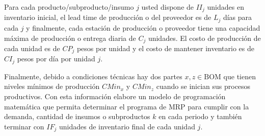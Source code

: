 \documentclass[11pt, a4paper]{article}
\begin{document}
  Para cada producto/subproducto/insumo $j$ usted dispone de $II_j$ unidades en inventario inicial, el lead time de producción o del proveedor es de $L_j$ días para cada $j$ y finalmente, cada estación de producción o proveedor tiene una capacidad máxima de producción o entrega diaria de $C_j$ unidades. El costo de producción de cada unidad es de $CP_j$ pesos por unidad y el costo de mantener inventario es de $CI_j$ pesos por día por unidad $j$. 

  Finalmente, debido a condiciones técnicas hay dos partes $x, z \in \text{BOM}$ que tienen niveles mínimos de producción $CMin_x$ y $CMin_z$ cuando se inician sus procesos productivos. Con esta información elabore un modelo de programación matemática que permita determinar el programa de MRP para cumplir con la demanda, cantidad de insumos o subproductos $k$ en cada periodo y también terminar con $IF_j$ unidades de inventario final de cada unidad $j$.
\end{document}
